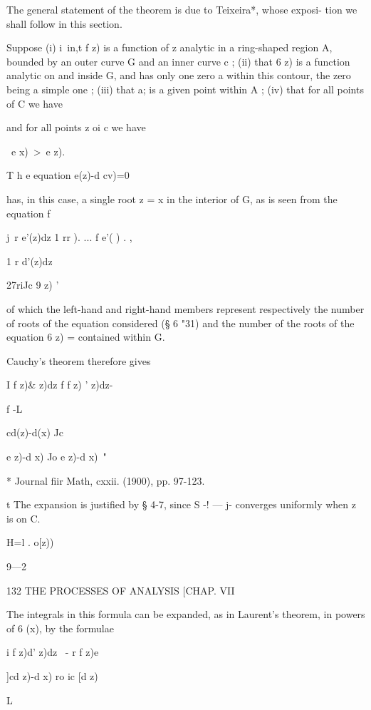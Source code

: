 The general statement of the theorem is due to Teixeira*, whose
exposi- tion we shall follow in this section.

Suppose (i) i\ in,t f z) is a function of z analytic in a ring-shaped
region A, bounded by an outer curve G and an inner curve c ; (ii) that
6 z) is a function analytic on and inside G, and has only one zero a
within this contour, the zero being a simple one ; (iii) that a; is a
given point within A ; (iv) that for all points of C we have

and for all points z oi c we have

\ e x)\ >\ e z).

T h e equation e(z)-d cv)=0

has, in this case, a single root z = x in the interior of G, as is
seen from the equation f

j\ r e'(z)dz 1 rr ). ... f e'( ) . ,

1 r d'(z)dz



27riJc 9 z) '

of which the left-hand and right-hand members represent respectively
the number of roots of the equation considered (§ 6 "31) and the
number of the roots of the equation 6 z) = contained within G.

Cauchy's theorem therefore gives

I f z)\& z)dz f f z) ' z)dz-



f -L



 cd(z)-d(x) Jc



e z)-d x) Jo e z)-d x)\ "

* Journal fiir Math, cxxii. (1900), pp. 97-123.

t The expansion is justified by § 4-7, since S -! — j- converges
uniformly when z is on C.

H=l . o[z))



9—2



132 THE PROCESSES OF ANALYSIS [CHAP. VII

The integrals in this formula can be expanded, as in Laurent's
theorem, in powers of 6 (x), by the formulae



i f z)d' z)dz \ - r f z)e

]cd z)-d x) ro ic [d z)\

L



